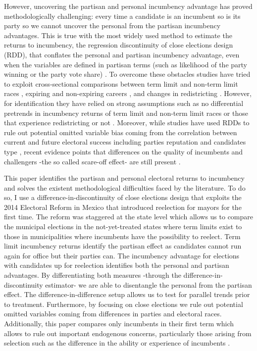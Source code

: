 \documentclass[12pt]{amsart}
\numberwithin{equation}{section}
\theoremstyle{definition}
\theoremstyle{definition}
\theoremstyle{definition}
\begin{document}
However, uncovering the partisan and personal incumbency advantage has proved methodologically challenging: every time a candidate is an incumbent so is its party so we cannot uncover the personal from the partisan incumbency advantages. This is true with the most widely used method to estimate the returns to incumbency, the regression discontinuity of close elections design (RDD), that conflates the personal and partisan incumbency advantage, even when the variables are defined in partisan terms (such as likelihood of the party winning or the party vote share) \citep{fowler_hall_2014}. To overcome these obstacles studies have tried to exploit cross-sectional comparisons between term limit and non-term limit races \citep{gelman_king_1990}, expiring and non-expiring careers \citep{fowler_hall_2014}, and changes in redistricting \citep{ansolabehere_snyder_2000, desposato_petrocik_2003, sekhon_titiunik_2012}. However, for identification they have relied on strong assumptions such as no differential pretrends in incumbency returns of term limit and non-term limit races \citep{fowler_hall_2014} or those that experience redistricting or not \citep{ansolabehere_snyder_2004}. %
Moreover,  while studies have used RDDs to rule out potential omitted variable bias coming from the correlation between current and future electoral success including parties reputation and candidates type \citep{klasnja_titiunik_2017}, recent evidence points that differences on the quality of incumbents and challengers -the so called scare-off effect- are still present \citep{eggers_2017}. 

This paper identifies the partisan and personal electoral returns to incumbency and solves the existent methodological difficulties faced by the literature. To do so, I use a difference-in-discontinuity of close elections design that exploits the 2014 Electoral Reform in Mexico that introduced reelection for mayors for the first time. The reform was staggered at the state level which allows us to compare the municipal elections in the not-yet-treated states where term limits exist to those in municipalities where incumbents have the possibility to reelect. Term limit incumbency returns identify the partisan effect as candidates cannot run again for office but their parties can. The incumbency advantage for elections with candidates up for reelection identifies both the personal and partisan advantages. By differentiating both measures -through the difference-in-discontinuity estimator- we are able to disentangle the personal from the partisan effect. The difference-in-difference setup allows us to test for parallel trends prior to treatment. Furthermore, by focusing on close elections we rule out potential omitted variables coming from differences in parties and electoral races. Additionally, this paper compares only incumbents in their first term which allows to rule out important endogenous concerns, particularly those arising from selection such as the difference in the ability or experience of incumbents \citep{ferraz_finan_2008, ferraz_finan_2011}.
 
\end{document}
